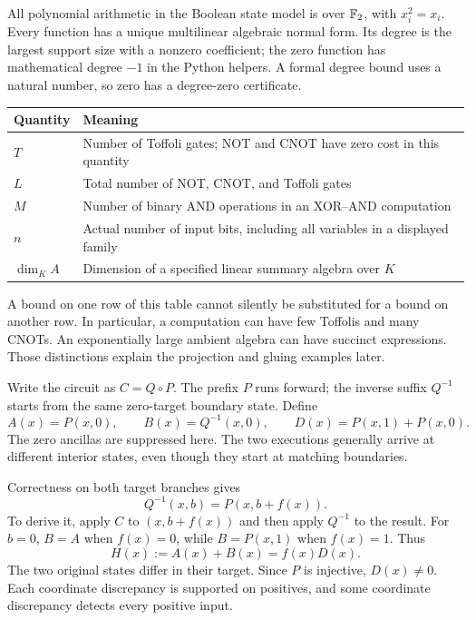 All polynomial arithmetic in the Boolean state model is over $\mathbb F_2$, with
$x_i^2=x_i$. Every function has a unique multilinear algebraic normal form.
Its degree is the largest support size with a nonzero coefficient; the zero
function has mathematical degree $-1$ in the Python helpers. A formal degree
bound uses a natural number, so zero has a degree-zero certificate.

\begin{tabularx}{\textwidth}{@{}p{1.15in}X@{}}\toprule
Quantity & Meaning\\\midrule
$T$ & Number of Toffoli gates; NOT and CNOT have zero cost in this quantity\\
$L$ & Total number of NOT, CNOT, and Toffoli gates\\
$M$ & Number of binary AND operations in an XOR--AND computation\\
$n$ & Actual number of input bits, including all variables in a displayed family\\
$\dim_K A$ & Dimension of a specified linear summary algebra over $K$\\\bottomrule
\end{tabularx}

A bound on one row of this table cannot silently be substituted for a bound
on another row. In particular, a computation can have few Toffolis and many
CNOTs. An exponentially large ambient algebra can have succinct expressions.
Those distinctions explain the projection and gluing examples later.


Write the circuit as $C=Q\circ P$. The prefix $P$ runs forward; the inverse
suffix $Q^{-1}$ starts from the same zero-target boundary state. Define
\[
 A(x)=P(x,0),\qquad B(x)=Q^{-1}(x,0),\qquad
 D(x)=P(x,1)+P(x,0).
\]
The zero ancillas are suppressed here. The two executions generally arrive
at different interior states, even though they start at matching boundaries.


Correctness on both target branches gives
\[
 Q^{-1}(x,b)=P(x,b+f(x)).
\]
To derive it, apply $C$ to $(x,b+f(x))$ and then apply $Q^{-1}$ to the result.
For $b=0$, $B=A$ when $f(x)=0$, while $B=P(x,1)$ when $f(x)=1$. Thus
\[
 H(x):=A(x)+B(x)=f(x)D(x).
\]
The two original states differ in their target. Since $P$ is injective,
$D(x)\ne0$. Each coordinate discrepancy is supported on positives, and
some coordinate discrepancy detects every positive input.

